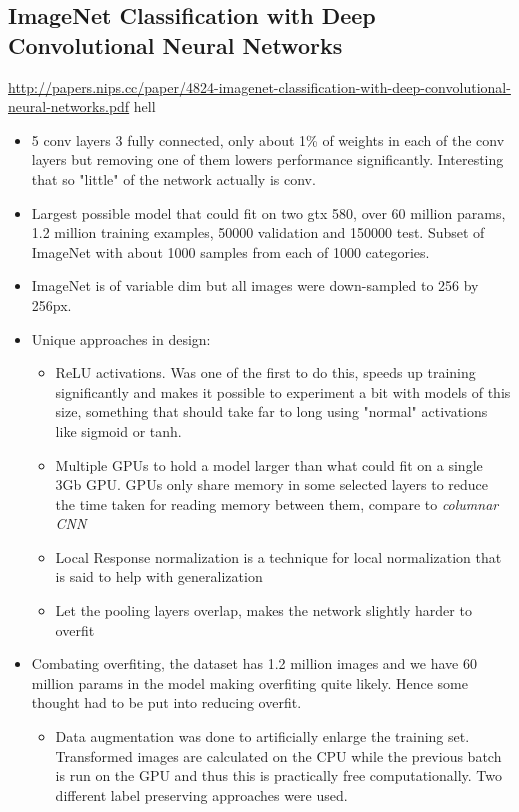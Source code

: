 \documentclass[11pt]{article}
\begin{document}
\subsection{ImageNet Classification with Deep Convolutional Neural Networks}
\label{sec:orgcf0c940}
\url{http://papers.nips.cc/paper/4824-imagenet-classification-with-deep-convolutional-neural-networks.pdf}
hell
\begin{itemize}
\item 5 conv layers 3 fully connected, only about 1\% of weights in each of the conv layers but removing one of them lowers performance significantly. Interesting that so "little" of the network actually is conv.
\item Largest possible model that could fit on two gtx 580, over 60 million params, 1.2 million training examples, 50000 validation and 150000 test. Subset of ImageNet with about 1000 samples from each of 1000 categories.
\item ImageNet is of variable dim but all images were down-sampled to 256 by 256px.
\item Unique approaches in design:
\begin{itemize}
\item ReLU activations. Was one of the first to do this, speeds up training significantly and makes it possible to experiment a bit with models of this size, something that should take far to long using "normal" activations like sigmoid or tanh.
\item Multiple GPUs to hold a model larger than what could fit on a single 3Gb GPU. GPUs only share memory in some selected layers to reduce the time taken for reading memory between them, compare to \emph{columnar CNN}
\item Local Response normalization is a technique for local normalization that is said to help with generalization
\item Let the pooling layers overlap, makes the network slightly harder to overfit
\end{itemize}
\item Combating overfiting, the dataset has 1.2 million images and we have 60 million params in the model making overfiting quite likely. Hence some thought had to be put into reducing overfit.
\begin{itemize}
\item Data augmentation was done to artificially enlarge the training set. Transformed images are calculated on the CPU while the previous batch is run on the GPU and thus this is practically free computationally. Two different label preserving approaches were used. 

\end{itemize}
\end{itemize}
\end{document}
